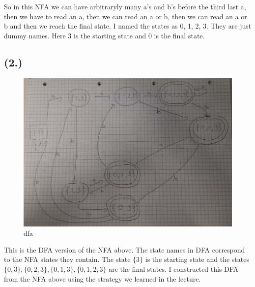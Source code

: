 \documentclass{article}
\begin{document}
So in this NFA we can have arbitraryly many a's and b's before the third last a, then we have to read an a, then we can read an a or b, then we can read an a or b and then we reach the final state.
I named the states as 0, 1, 2, 3. They are just dummy names. Here 3 is the starting state and 0 is the final state.

\subsection*{(2.)}

\begin{figure}[h!]
  \centering
  \includegraphics[width=1\textwidth]{3_dfa.jpeg}
  \caption{dfa}
\end{figure}
This is the DFA version of the NFA above. The state names in DFA correspond to the NFA states they contain. The state \(\{3\}\) is the starting state
and the states \(\{0, 3\}, \{0,2,3\}, \{0,1,3\}, \{0,1,2,3\}\) are the final states. I constructed this DFA from the NFA above using the strategy we learned in the lecture.
\end{document}
